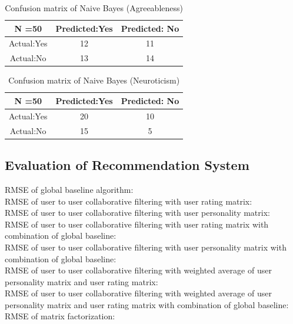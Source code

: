 \begin{table}[!ht]
\centering
\begin{tabular}{ |c|c|c| } 
 \hline
 N =50 & Predicted:Yes & Predicted: No \\
 \hline
 Actual:Yes&12 & 11 \\ 
 \hline
 Actual:No&13 & 14 \\ 
 \hline
\end{tabular}
 \caption{Confusion matrix of Naive Bayes (Agreeableness)}
\end{table}

\begin{table}[!ht]
\centering
\begin{tabular}{ |c|c|c| } 
 \hline
 N =50 & Predicted:Yes & Predicted: No \\
 \hline
 Actual:Yes&20 & 10 \\ 
 \hline
 Actual:No&15 & 5 \\ 
 \hline
\end{tabular}
 \caption{Confusion matrix of Naive Bayes (Neuroticism)}
\end{table}


\subsection{Evaluation of Recommendation System}
RMSE of global baseline algorithm: \\
RMSE of user to user collaborative filtering with user rating matrix: \\
RMSE of user to user collaborative filtering with user personality matrix: \\
RMSE of user to user collaborative filtering with user rating matrix with combination of global baseline: \\
RMSE of user to user collaborative filtering with user personality matrix with combination of global baseline: \\
RMSE of user to user collaborative filtering with weighted average of user personality matrix and user rating matrix:\\
RMSE of user to user collaborative filtering with weighted average of user personality matrix and user rating matrix with combination of global baseline: \\
RMSE of matrix factorization: \\




